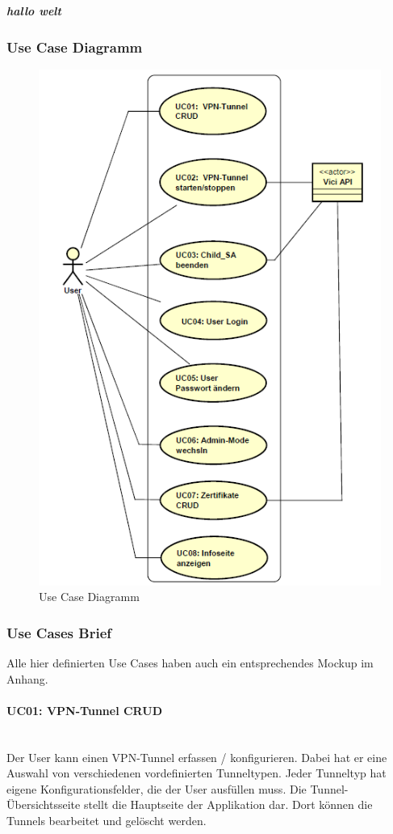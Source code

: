 \subparagraph{hallo welt}


\subsubsection{Use Case Diagramm}
\begin{figure}[H]
\centering
\includegraphics[width=420pt]{images/strongMan_usecase.png}
\caption[Use Case Diagramm]{Use Case Diagramm}
\end{figure}


\subsubsection{Use Cases Brief}
Alle hier definierten Use Cases haben auch ein entsprechendes Mockup im Anhang.
\paragraph{UC01: VPN-Tunnel CRUD}\mbox{} \\
Der User kann einen VPN-Tunnel erfassen / konfigurieren. Dabei hat er eine Auswahl von verschiedenen vordefinierten Tunneltypen. Jeder Tunneltyp hat eigene Konfigurationsfelder, die der User ausfüllen muss. Die Tunnel-Übersichtsseite stellt die Hauptseite der Applikation dar. Dort können die Tunnels bearbeitet und gelöscht werden.

